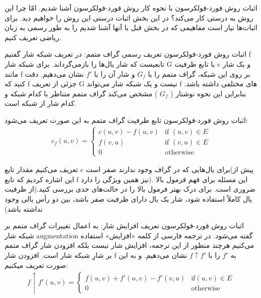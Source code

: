 \begin{itemframe}{اثبات روش فورد-فولکرسون}
\itm
با نحوه کار روش فورد-فولکرسون آشنا شدیم. امّا چرا این روش به درستی کار می‌کند؟
\itm
در این بخش اثبات درستی این روش را خواهیم دید. برای اثبات‌ها نیاز است مفاهیمی که در بخش قبل با آنها آشنا شدیم را به طور رسمی به زبان ریاضی تعریف کنیم.
\end{itemframe}

\begin{itemframe}{اثبات روش فورد-فولکرسون}
\itm
تعریف رسمی گراف متمم:
\itm
در تعریف شبکه شار گفتیم f تابعیست که شار یال‌ها را بازمی‌گرداند. برای شبکه شار G با تابع ظرفیت c و یک شار مانند f بر روی این شبکه، گراف متمم را با
$G_f$
و شار آن را با
$f'$
 نشان می‌دهیم.
\itm
 دقت کنید که f جزئی از تعریف G نیست و یک شبکه شار می‌تواند f های مختلفی داشته باشد. بنابراین این نحوه نوشتار (
$G_f$
) مشخص می‌کند گراف متمم متناظر با کدام شبکه و کدام شار از شبکه است.
\end{itemframe}

\begin{itemframe}{اثبات روش فورد-فولکرسون}
\itm
تابع ظرفیت گراف متمم به این صورت تعریف می‌شود:
\begin{align}
c_f(u, v)=
\begin{cases}
c(u, v) - f(u, v) & \text{if } (u, v) \in E\\
f(v, u) & \text{if } (v, u) \in E\\
0 & \text{otherwise}
\end{cases}
\label{res-net-cap}
\end{align}

\itm
تعریف می‌کنیم مقدار تابع c برای یال‌هایی که در گراف وجود ندارند صفر است(پیش از این اشاره کردیم که تابع f نیز همین ویژگی را دارد). این مسئله برای فهم فرمول بالا ضروری است. برای درک بهتر فرمول بالا را در حالت‌های حدی بررسی کنید.(از ظرفیت یال کاملاً استفاده شود، شار یک یال دارای ظرفیت صفر باشد، بین دو رأس یالی وجود نداشته باشد)

\end{itemframe}

\begin{itemframe}{اثبات روش فورد-فولکرسون}
\itm
تعریف افزایش شار:
\itm
به اعمال تغییرات گراف متمم بر شبکه شار augmentation گفته می‌شود. در ترجمه فارسی از کلمه «افزایش» استفاده می‌کنیم هرچند منظور از این ترجمه، افزایش شار نیست بلکه افزودن شار گراف متمم بر شارِ شبکه شار است.
\itm
افزودن شار f به
$f'$
را با
$f \uparrow f'$
نشان می‌دهیم. و به این صورت تعریف میکنیم:
\begin{align}
f \uparrow f'(u, v)=
\begin{cases}
f(u, v)+f'(u, v)-f'(v, u)& \text{if} (u, v) \in E\\
0 &\text{otherwise}
\end{cases}
\label{aug-flow-def}
\end{align}
\end{itemframe}

